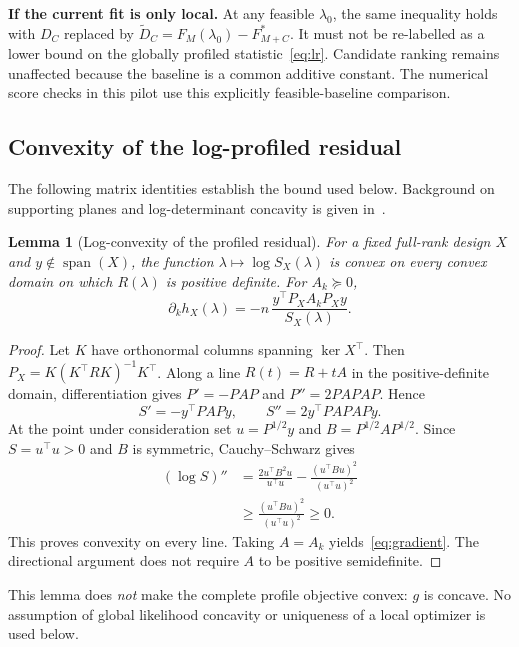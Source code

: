 \documentclass[preprint,11pt,numbers]{elsarticle}
\newtheorem{lemma}[theorem]{Lemma}
\theoremstyle{remark}\newtheorem{remark}[theorem]{Remark}
\newcommand{\Span}{\operatorname{span}}
\begin{document}
\textbf{If the current fit is only local.} At any feasible $\lambda_0$, the same
inequality holds with $D_C$ replaced by
$\widetilde D_C=F_M(\lambda_0)-F_{M+C}^*$. It must not be re-labelled as a lower bound
on the globally profiled statistic~\eqref{eq:lr}. Candidate ranking remains
unaffected because the baseline is a common additive constant. The numerical
score checks in this pilot use this explicitly feasible-baseline comparison.

\subsection{Convexity of the log-profiled residual}
The following matrix identities establish the bound used below. Background on supporting planes and log-determinant concavity is given in~\cite{boyd}.

\begin{lemma}[Log-convexity of the profiled residual]\label{lem:convex}
For a fixed full-rank design $X$ and $y\notin\Span(X)$, the function
$\lambda\mapsto\log S_X(\lambda)$ is convex on every convex domain on which
$R(\lambda)$ is positive definite. For $A_k\succeq0$,
\begin{equation}\label{eq:gradient}
\partial_k h_X(\lambda)
=-n\,\frac{y^\top P_X A_kP_Xy}{S_X(\lambda)}.
\end{equation}
\end{lemma}
\begin{proof}
Let $K$ have orthonormal columns spanning $\ker X^\top$. Then
$P_X=K(K^\top RK)^{-1}K^\top$. Along a line $R(t)=R+tA$ in the positive-definite
domain, differentiation gives $P'=-PAP$ and $P''=2PAPAP$. Hence
\[
S'=-y^\top PAPy,\qquad S''=2y^\top PAPAPy.
\]
At the point under consideration set $u=P^{1/2}y$ and $B=P^{1/2}AP^{1/2}$. Since
$S=u^\top u>0$ and $B$ is symmetric, Cauchy--Schwarz gives
\begin{align*}
(\log S)''
&=\frac{2u^\top B^2u}{u^\top u}
 -\frac{(u^\top Bu)^2}{(u^\top u)^2}\\
&\geq\frac{(u^\top Bu)^2}{(u^\top u)^2}\geq0.
\end{align*}
This proves convexity on every line. Taking $A=A_k$ yields~\eqref{eq:gradient}.
The directional argument does not require $A$ to be positive semidefinite.
\end{proof}

This lemma does \emph{not} make the complete profile objective convex: $g$ is
concave. No assumption of global likelihood concavity or uniqueness of a local
optimizer is used below.
\end{document}
